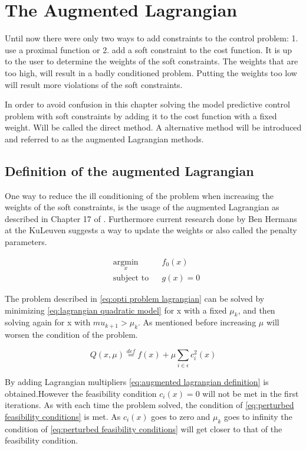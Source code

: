 \chapter{The Augmented Lagrangian}
Until now there were only two ways to add constraints to the control problem: 1. use a proximal function or 2. add a soft constraint to the cost function. It is up to the user to determine the weights of the soft constraints. The weights that are too high, will result in a badly conditioned problem. Putting the weights too low will result more violations of the soft constraints.

In order to avoid confusion in this chapter solving the model predictive control problem with soft constraints by adding it to the cost function with a fixed weight. Will be called the direct method. A alternative method will be introduced and referred to as the augmented Lagrangian methods.

\section{Definition of the augmented Lagrangian}
	One way to reduce the ill conditioning of the problem when increasing the weights of the soft constraints, is the usage of the augmented Lagrangian as described in Chapter 17 of \cite{Wright}. Furthermore current research done by Ben Hermans at the KuLeuven suggests a way to update the weights or also called the penalty parameters.
	
	\begin{equation}
		\begin{aligned}
			& \underset{x}{\text{argmin}}
			& & f_0(x) \\
			& \text{subject to}
			& & g(x)=0
		\end{aligned}
		\label{eq:opti problem lagrangian}
	\end{equation}
	
	The problem described in \eqref{eq:opti problem lagrangian} can be solved by minimizing \eqref{eq:lagrangian quadratic model}  for x with a fixed $\mu_k$, and then solving again for x with $mu_{k+1}>\mu_k $. As mentioned before increasing $\mu$ will worsen the condition of the problem. 
	
	\begin{equation}
		Q(x,\mu) \overset{def}{=} f(x) + \mu \sum_{i \in \epsilon} c_i^2(x)
		\label{eq:lagrangian quadratic model}
	\end{equation}
	
	By adding Lagrangian multipliers \eqref{eq:augmented lagrangian definition} is obtained.However the feasibility condition $c_i(x)=0$ will not be met in the first iterations. As with each time the problem solved, the condition of \eqref{eq:perturbed feasibility conditions} is met. As $c_i(x)$ goes to zero and $\mu_k$ goes to infinity the condition of \eqref{eq:perturbed feasibility conditions} will get closer to that of the feasibility condition.
	

